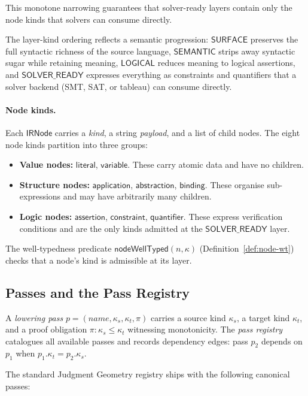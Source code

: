 \documentclass[11pt]{article}
\newcommand{\IRN}{\mathsf{IRNode}}
\newcommand{\Surface}{\mathsf{SURFACE}}
\newcommand{\Semantic}{\mathsf{SEMANTIC}}
\newcommand{\Logical}{\mathsf{LOGICAL}}
\newcommand{\SolverReady}{\mathsf{SOLVER\_READY}}
\begin{document}
This monotone narrowing guarantees that solver-ready layers contain
only the node kinds that solvers can consume directly.

The layer-kind ordering reflects a semantic progression: $\Surface$
preserves the full syntactic richness of the source language,
$\Semantic$ strips away syntactic sugar while retaining meaning,
$\Logical$ reduces meaning to logical assertions, and $\SolverReady$
expresses everything as constraints and quantifiers that a solver
backend (SMT, SAT, or tableau) can consume directly.

\paragraph{Node kinds.}
Each $\IRN$ carries a \emph{kind}, a string \emph{payload}, and a list
of child nodes.  The eight node kinds partition into three groups:
\begin{itemize}
\item \textbf{Value nodes:} $\mathsf{literal}$, $\mathsf{variable}$.
  These carry atomic data and have no children.
\item \textbf{Structure nodes:} $\mathsf{application}$,
  $\mathsf{abstraction}$, $\mathsf{binding}$.  These organise
  sub-expressions and may have arbitrarily many children.
\item \textbf{Logic nodes:} $\mathsf{assertion}$,
  $\mathsf{constraint}$, $\mathsf{quantifier}$.  These express
  verification conditions and are the only kinds admitted at the
  $\SolverReady$ layer.
\end{itemize}
The well-typedness predicate $\mathsf{nodeWellTyped}(n, \kappa)$
(Definition~\ref{def:node-wt}) checks that a node's kind is admissible
at its layer.

\subsection{Passes and the Pass Registry}\label{sec:passes}

A \emph{lowering pass} $p = (\mathit{name}, \kappa_s, \kappa_t, \pi)$
carries a source kind $\kappa_s$, a target kind $\kappa_t$, and a
proof obligation $\pi : \kappa_s \le \kappa_t$ witnessing monotonicity.
The \emph{pass registry} catalogues all available passes and records
dependency edges: pass $p_2$ depends on $p_1$ when $p_1.\kappa_t =
p_2.\kappa_s$.

The standard Judgment Geometry registry ships with the following
canonical passes:
\end{document}
